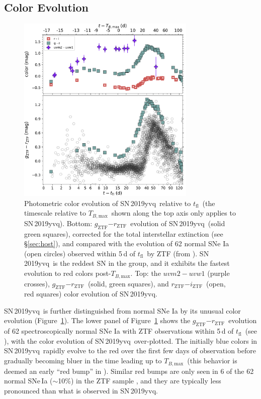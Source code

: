\documentclass[twocolumn]{aastex63}
\newcommand{\rztf}{$r_\mathrm{ZTF}$}
\newcommand{\gztf}{$g_\mathrm{ZTF}$}
\newcommand{\iztf}{$i_\mathrm{ZTF}$}
\newcommand{\tfl}{$t_\mathrm{fl}$}
\newcommand{\tbmax}{$T_{B,\mathrm{max}}$}
\newcommand{\sn}{SN\,2019yvq}
\begin{document}
\subsection{Color Evolution}

\begin{figure}
    \centering
    \includegraphics[width=3.35in]{./figures/P48_colors.pdf}
    \caption{Photometric color evolution of \sn\ relative to \tfl\ (the
    timescale relative to \tbmax\ shown along the top axis only applies to
    \sn). Bottom: \gztf$ - $\rztf\ evolution of \sn\ (solid green squares),
    corrected for the total interstellar extinction (see \S\ref{sec:host}),
    and compared with the evolution of 62 normal SNe Ia (open circles)
    observed within 5\,d of \tfl\ by ZTF (from \citealt{Bulla20}). \sn\ is the
    reddest SN in the group, and it exhibits the fastest evolution to red
    colors post-\tbmax. Top: the $uvm2 - uvw1$ (purple crosses), \gztf$ -
    $\rztf\ (solid, green squares), and \rztf$ - $\iztf\ (open, red squares)
    color evolution of \sn.}
    \label{fig:colors}
\end{figure}

\sn\ is further distinguished from normal SNe Ia by its unusual color
evolution (Figure~\ref{fig:colors}). The lower panel of
Figure~\ref{fig:colors} shows the \gztf$ - $\rztf\ evolution of 62
spectroscopically normal SNe Ia with ZTF observations within 5\,d of \tfl\
(see \citealt{Bulla20}), with the color evolution of \sn\ over-plotted. The
initially blue colors in \sn\ rapidly evolve to the red over the first few
days of observation before gradually becoming bluer in the time leading up to
\tbmax\ (this behavior is deemed an early ``red bump'' in \citealt{Bulla20}).
Similar red bumps are only seen in 6 of the 62 normal SNe\,Ia ($\sim$10\%) in
the ZTF sample \citep{Bulla20}, and they are typically less pronounced than
what is observed in \sn.
\end{document}
